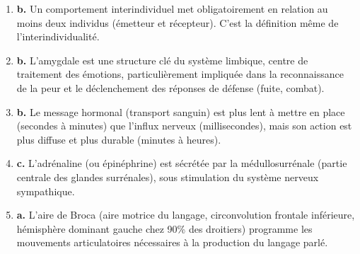 \documentclass[11pt]{article}
\begin{document}
\begin{corrige}
\begin{enumerate}
\item \textbf{b.} Un comportement interindividuel met obligatoirement en relation au moins deux individus (émetteur et récepteur). C'est la définition même de l'interindividualité.
\item \textbf{b.} L'amygdale est une structure clé du système limbique, centre de traitement des émotions, particulièrement impliquée dans la reconnaissance de la peur et le déclenchement des réponses de défense (fuite, combat).
\item \textbf{b.} Le message hormonal (transport sanguin) est plus lent à mettre en place (secondes à minutes) que l'influx nerveux (millisecondes), mais son action est plus diffuse et plus durable (minutes à heures).
\item \textbf{c.} L'adrénaline (ou épinéphrine) est sécrétée par la médullosurrénale (partie centrale des glandes surrénales), sous stimulation du système nerveux sympathique.
\item \textbf{a.} L'aire de Broca (aire motrice du langage, circonvolution frontale inférieure, hémisphère dominant gauche chez 90\% des droitiers) programme les mouvements articulatoires nécessaires à la production du langage parlé.
\end{enumerate}
\end{corrige}
\end{document}
